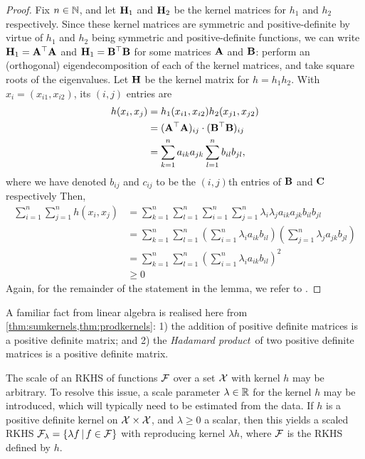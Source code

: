 \begin{proof}
  Fix $n\in\mathbb{N}$, and let ${\mathbf H}_1$ and ${\mathbf H}_2$ be the kernel matrices for $h_1$ and $h_2$ respectively.
  Since these kernel matrices are symmetric and positive-definite by virtue of $h_1$ and $h_2$ being symmetric and positive-definite functions, we can write ${\mathbf H}_1 = {\mathbf A}^\top{\mathbf A}$ and ${\mathbf H}_1 = {\mathbf B}^\top{\mathbf B}$ for some matrices ${\mathbf A}$ and ${\mathbf B}$: perform an (orthogonal) eigendecomposition of each of the kernel matrices, and take square roots of the eigenvalues.
  Let ${\mathbf H}$ be the kernel matrix for $h = h_1h_2$.
  With $x_i = (x_{i1}, x_{i2})$, its $(i,j)$ entries are
  \begin{align*}
    h(x_i,x_j)
    &= h_1(x_{i1},x_{i2}) h_2(x_{j1},x_{j2}) \\
    &= ({\mathbf A}^\top{\mathbf A})_{ij}\cdot ({\mathbf B}^\top{\mathbf B})_{ij} \\
    &= \sum_{k=1}^n a_{ik}a_{jk} \sum_{l=1}^n b_{il}b_{jl},
  \end{align*}
  where we have denoted $b_{ij}$ and $c_{ij}$ to be the $(i,j)$th entries of ${\mathbf B}$ and ${\mathbf C}$ respectively 
  Then,
  \begin{align*}
    \sum_{i=1}^n\sum_{j=1}^n h(x_i,x_j)
    &= \sum_{k=1}^n \sum_{l=1}^n \sum_{i=1}^n \sum_{j=1}^n  \lambda_i \lambda_j a_{ik}a_{jk}b_{il}b_{jl} \\
    &= \sum_{k=1}^n \sum_{l=1}^n \left(\sum_{i=1}^n \lambda_i a_{ik} b_{il} \right) \left( \sum_{j=1}^n  \lambda_j a_{jk}b_{jl} \right) \\
    &= \sum_{k=1}^n \sum_{l=1}^n \left(\sum_{i=1}^n \lambda_i a_{ik} b_{il} \right)^2 \\
    &\geq 0
  \end{align*}
  Again, for the remainder of the statement in the lemma, we refer to \citet[Theorem 13]{berlinet2011reproducing}.
\end{proof}

A familiar fact from linear algebra is realised here from \cref{thm:sumkernels,thm:prodkernels}: 
1) the addition of positive definite matrices is a positive definite matrix; and 
2) the \emph{Hadamard product}\footnotemark~of two positive definite matrices is a positive definite matrix.

The scale of an RKHS of functions ${\mathcal F}$ over a set ${\mathcal X}$ with kernel $h$ may be arbitrary.
To resolve this issue, a scale parameter $\lambda\in\mathbb{R}$ for the kernel $h$ may be introduced, which will typically need to be estimated from the data. 
If $h$ is a positive definite kernel on ${\mathcal X}\times{\mathcal X}$, and $\lambda \geq 0$ a scalar, then this yields a scaled RKHS ${\mathcal F}_\lambda = \{\lambda f \,|\, f \in {\mathcal F} \}$ with reproducing kernel $\lambda h$, where ${\mathcal F}$ is the RKHS defined by $h$.


